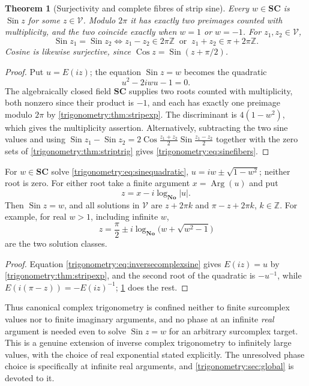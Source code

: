 \documentclass[11pt,letterpaper]{article}
\numberwithin{equation}{section}
\newtheorem{theorem}{Theorem}[section]
\theoremstyle{definition}
\theoremstyle{remark}
\newcommand{\No}{\mathbf{No}}
\newcommand{\SC}{\mathbf{SC}}
\newcommand{\Z}{\mathbb Z}
\newcommand{\Arg}{\operatorname{Arg}}
\newcommand{\Sin}{\operatorname{Sin}}
\newcommand{\Cos}{\operatorname{Cos}}
\begin{document}
\begin{theorem}[Surjectivity and complete fibres of strip sine]
\label{trigonometry:thm:sinefibers}
Every $w\in\SC$ is $\Sin z$ for some $z\in\mathscr V$. Modulo $2\pi$ it has exactly two preimages
counted with multiplicity, and the two coincide exactly when $w=1$ or $w=-1$. For
$z_1,z_2\in\mathscr V$,
\begin{equation}\label{trigonometry:eq:sinefibers}
 \Sin z_1=\Sin z_2
 \iff
 z_1-z_2\in2\pi\Z\ \text{ or }\ z_1+z_2\in\pi+2\pi\Z .
\end{equation}
Cosine is likewise surjective, since $\Cos z=\Sin(z+\pi/2)$.
\end{theorem}
\begin{proof}
Put $u=E(iz)$; the equation $\Sin z=w$ becomes the quadratic
\begin{equation}\label{trigonometry:eq:sinequadratic}
 u^2-2iwu-1=0 .
\end{equation}
The algebraically closed field $\SC$ supplies two roots counted with multiplicity, both nonzero
since their product is $-1$, and each has exactly one preimage modulo $2\pi$ by
\cref{trigonometry:thm:stripexp}. The discriminant is $4(1-w^2)$, which gives the multiplicity
assertion. Alternatively, subtracting the two sine values and using
$\Sin z_1-\Sin z_2=2\Cos\frac{z_1+z_2}2\Sin\frac{z_1-z_2}2$ together with the zero sets of
\cref{trigonometry:thm:striptrig} gives \cref{trigonometry:eq:sinefibers}.
\end{proof}

\begin{corollary}\label{trigonometry:cor:sineinverse}
For $w\in\SC$ solve \cref{trigonometry:eq:sinequadratic}, $u=iw\pm\sqrt{1-w^2}$; neither root is
zero. For either root take a finite argument $x=\Arg(u)$ and put
\begin{equation}\label{trigonometry:eq:inversecomplexsine}
 z=x-i\log_{\No}|u| .
\end{equation}
Then $\Sin z=w$, and all solutions in $\mathscr V$ are $z+2\pi k$ and $\pi-z+2\pi k$, $k\in\Z$. For
example, for real $w>1$, including infinite $w$,
\[
 z=\frac\pi2\pm i\log_{\No}\bigl(w+\sqrt{w^2-1}\bigr)
\]
are the two solution classes.
\end{corollary}
\begin{proof}
Equation \cref{trigonometry:eq:inversecomplexsine} gives $E(iz)=u$ by
\cref{trigonometry:thm:stripexp}, and the second root of the quadratic is $-u^{-1}$, while
$E(i(\pi-z))=-E(iz)^{-1}$; \cref{trigonometry:thm:sinefibers} does the rest.
\end{proof}
Thus canonical complex trigonometry is confined neither to finite surcomplex values nor to finite
imaginary arguments, and no phase at an infinite \emph{real} argument is needed even to solve
$\Sin z=w$ for an arbitrary surcomplex target. This is a genuine extension of inverse complex
trigonometry to infinitely large values, with the choice of real exponential stated explicitly.
The unresolved phase choice is specifically at infinite real arguments, and
\cref{trigonometry:sec:global} is devoted to it.
\end{document}
